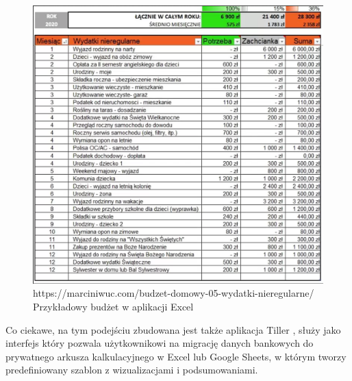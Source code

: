 \documentclass[a4paper,10pt, twoside]{report}
\begin{document}
\begin{large}
\begin{figure}[H]           %
    \centering
    \includegraphics[width=12cm]{figures/marciniwuc.com_Wydatki-nieregularne-plan-roczny.png}
    \caption{https://marciniwuc.com/budzet-domowy-05-wydatki-nieregularne/ Przykładowy budżet w aplikacji Excel}
    \label{fig:budzetprzykladowyexcel}
\end{figure}

{Co ciekawe, na tym podejściu zbudowana jest także aplikacja Tiller 
\cite{tiller}, służy jako interfejs który pozwala użytkownikowi na migrację 
danych bankowych do prywatnego arkusza kalkulacyjnego w Excel lub Google Sheets,
 w którym tworzy predefiniowany szablon z wizualizacjami i podsumowaniami.}


\end{large}
\end{document}
